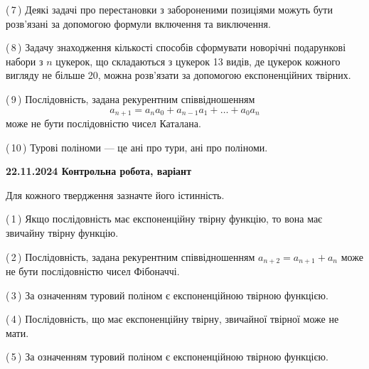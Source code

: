 \documentclass[12pt, ukrainian]{article}
\begin{document}
\begin {large}
\begin {large}
\begin {large}
\begin {large}
\begin {large}
\begin {large}
\begin {large}
\begin {large}
\begin {large}
\begin {large}
\begin {large}
\begin {large}
\begin {large}
\begin {large}
\begin {large}
\begin {large}
\begin {large}
\begin {large}
\begin {large}
\begin {large}
\begin {large}
\begin {large}
\begin {large}
\begin {large}
\begin {large}
\begin {large}
\begin {large}
\begin {large}
\begin {large}
\begin {large}
\begin {large}
\begin {large}
\begin {large}
{(\,7\,) Деякі задачі про перестановки з забороненими позиціями можуть бути розв’я\-за\-ні за допомогою формули включення та виключення.%



(\,8\,) Задачу знаходження кількості способів сформувати новорічні подарункові набори з $n$ цукерок, що складаються з цукерок 13 видів, де цукерок кожного вигляду не більше 20, можна розв’язати за допомогою експоненційних твірних.%



(\,9\,) Послідовність, задана рекурентним співвідношенням $$a_{n+1}=a_{n}a_{0}+a_{n-1}a_{1}+\ldots+a_0a_{n}$$ може не бути послідовністю чисел Каталана.%



(\,10\,) Турові поліноми --- це ані про тури, ані про поліноми.%




\vspace{5mm}
}
\newpage

\begin {large}

\textbf{22.11.2024 Контрольна робота, варіант  }\par


{
Для кожного твердження зазначте його істинність.\par

\vspace{2mm}

(\,1\,) Якщо послідовність має експоненційну твірну функцію, то вона має звичайну твірну функцію.%



(\,2\,) Послідовність, задана рекурентним співвідношенням $a_{n+2}=a_{n+1}+a_{n}$ може не бути послідовністю чисел Фібоначчі.%



(\,3\,) За означенням туровий поліном є експоненційною твірною функцією.%



(\,4\,) Послідовність, що має експоненційну твірну, звичайної твірної може не мати.%



(\,5\,) За означенням туровий поліном є експоненційною твірною функцією.%



}
\end{large}
\end{large}
\end{large}
\end{large}
\end{large}
\end{large}
\end{large}
\end{large}
\end{large}
\end{large}
\end{large}
\end{large}
\end{large}
\end{large}
\end{large}
\end{large}
\end{large}
\end{large}
\end{large}
\end{large}
\end{large}
\end{large}
\end{large}
\end{large}
\end{large}
\end{large}
\end{large}
\end{large}
\end{large}
\end{large}
\end{large}
\end{large}
\end{large}
\end{large}
\end{document}
